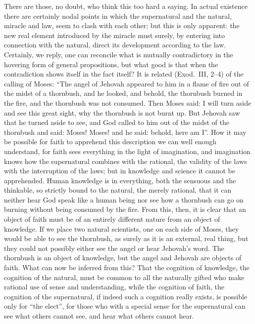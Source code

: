 \documentclass[12pt,a4paper]{article}
\newcommand{\opage}[1]{\marginnote{\footnotesize\textit{[#1]}}}
\begin{document}
There are those, no doubt, who think this too hard a saying. In actual
existence there are certainly nodal points in which the supernatural
and the natural, miracle and law, seem to clash with each other; but
this is only apparent: the new real element introduced by the miracle
must surely, by entering into connection with the natural, direct its
development according to the law. Certainly, we reply, one can
reconcile what is mutually contradictory in the hovering form of
general propositions, but what good is that when the contradiction
shows itself in the fact itself? It is related (Exod.\ III, 2--4) of
the calling of Moses: ``The angel of Jehovah appeared to him in a flame
of fire out of the midst of a thornbush, and he looked, and behold, the
thornbush burned in the fire, and the thornbush was not consumed. Then
Moses said: I will turn aside and see this great sight, why the
thornbush is not burnt up. But Jehovah saw that he turned aside to see,
and God called to him out of the midst of the thornbush and said:
Moses! Moses! and he said: behold, here am I''. How it may be possible
for faith to apprehend this description we can well enough understand,
for faith sees everything in the light of imagination, and imagination
knows how the supernatural combines with the rational, the validity of
the laws with the interruption of the laws; but in knowledge and
science it cannot be apprehended. Human knowledge is in everything,
both the sensuous and the thinkable, so strictly bound to the natural,
the merely rational, that it can neither hear God speak like a human
being nor see how a thornbush can go on burning without being consumed
by the fire. From this, then, it is clear that an object of faith must
be of an entirely different nature from an object of knowledge. If we
place two natural scientists, one on each side of Moses, they would be
able to see the thornbush, as surely as it is an external, real thing,
but they could not possibly either see the angel or hear Jehovah's
word. The thornbush is an object of knowledge, but the angel and
Jehovah are objects of faith.
What can now be inferred from this? That the cognition of knowledge,
the cognition of the natural, must be \opage{8} common to all the
naturally gifted who make rational use of
sense and understanding, while the cognition of faith,
the cognition of the supernatural, if indeed such a cognition really
exists, is possible only for ``the elect'', for those who with a
special sense for the supernatural can see what others cannot see, and
hear what others cannot hear.
\end{document}
